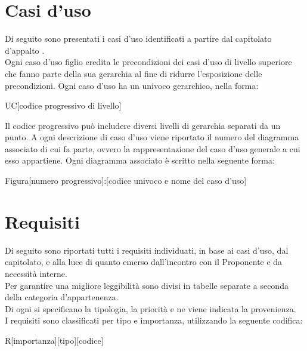\section{Casi d'uso} %
Di seguito sono presentati i casi d'uso identificati a partire dal capitolato d'appalto \Progetto. \\
Ogni caso d'uso figlio eredita le precondizioni dei casi d'uso di livello superiore che fanno parte della sua gerarchia al fine di ridurre l'esposizione delle precondizioni.
Ogni caso d'uso ha un  univoco gerarchico, nella forma:
\begin{center}
UC[codice progressivo di livello]
\end{center}
Il codice progressivo può includere diversi livelli di gerarchia separati da un punto.
A ogni descrizione di caso d'uso viene riportato il numero del diagramma associato di cui fa parte, ovvero la rappresentazione del caso d'uso generale a cui esso appartiene.
Ogni diagramma associato è scritto nella seguente forma:
\begin{center}
Figura[numero progressivo]:[codice univoco e nome del caso d'uso]
\end{center}




\newpage


\newpage


\newpage
\section{Requisiti} %
Di seguito sono riportati tutti i requisiti individuati, in base ai casi d'uso, dal capitolato, e alla luce di quanto emerso dall'incontro con il Proponente e da necessità interne.\\
Per garantire una migliore leggibilità sono divisi in tabelle separate a seconda della categoria d'appartenenza.\\
Di ogni  si specificano la tipologia, la priorità e ne viene indicata la provenienza.\\
I requisiti sono classificati per tipo e importanza, utilizzando la seguente codifica:\\
\begin{center}
R[importanza][tipo][codice]
\end{center}

